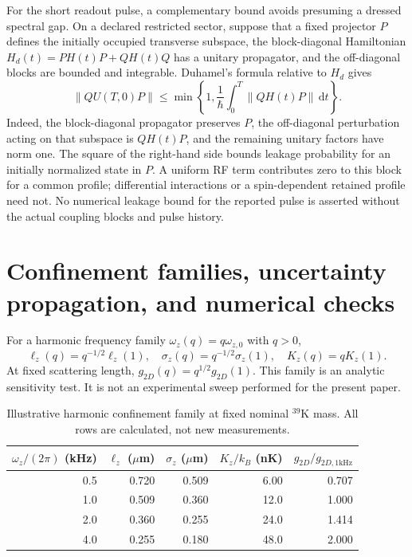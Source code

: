 \documentclass[11pt,a4paper]{article}
\theoremstyle{definition}
\theoremstyle{remark}
\newcommand{\dd}{\mathrm{d}}
\newcommand{\lop}{\ell_z}
\begin{document}
For the short readout pulse, a complementary bound avoids presuming a dressed spectral gap. On a declared restricted sector, suppose that a fixed projector $P$ defines the initially occupied transverse subspace, the block-diagonal Hamiltonian $H_d(t)=PH(t)P+QH(t)Q$ has a unitary propagator, and the off-diagonal blocks are bounded and integrable. Duhamel's formula relative to $H_d$ gives
\begin{equation}
 \|QU(T,0)P\|
 \leq\min\!\left\{1,\frac1\hbar\int_0^T
                         \|QH(t)P\|\,\dd t\right\}.
 \tag{74a}\label{eq:pulse_leakage_bound}
\end{equation}
Indeed, the block-diagonal propagator preserves $P$, the off-diagonal perturbation acting on that subspace is $QH(t)P$, and the remaining unitary factors have norm one. The square of the right-hand side bounds leakage probability for an initially normalized state in $P$. A uniform RF term contributes zero to this block for a common profile; differential interactions or a spin-dependent retained profile need not. No numerical leakage bound for the reported pulse is asserted without the actual coupling blocks and pulse history.\cite{zhang2026,precursor}

\section{Confinement families, uncertainty propagation, and numerical checks}
\label{app:numeric}
For a harmonic frequency family $\omega_z(q)=q\omega_{z,0}$ with $q>0$,
\begin{equation}
 \lop(q)=q^{-1/2}\lop(1),\quad
 \sigma_z(q)=q^{-1/2}\sigma_z(1),\quad
 K_z(q)=qK_z(1).
 \label{eq:q_family}
\end{equation}
At fixed scattering length, $g_{2D}(q)=q^{1/2}g_{2D}(1)$. This family is an analytic sensitivity test. It is not an experimental sweep performed for the present paper.

\begin{table}[htbp]
\centering\small
\caption{Illustrative harmonic confinement family at fixed nominal $^{39}\mathrm K$ mass. All rows are calculated, not new measurements.}
\label{tab:family}
\begin{tabular}{@{}rrrrr@{}}
\toprule
$\omega_z/(2\pi)$ (kHz)&$\lop$ ($\mu$m)&$\sigma_z$ ($\mu$m)&$K_z/k_B$ (nK)&$g_{2D}/g_{2D,1\mathrm{kHz}}$\\\midrule
0.5&0.720&0.509&6.00&0.707\\
1.0&0.509&0.360&12.0&1.000\\
2.0&0.360&0.255&24.0&1.414\\
4.0&0.255&0.180&48.0&2.000\\
\bottomrule
\end{tabular}
\end{table}
\end{document}

